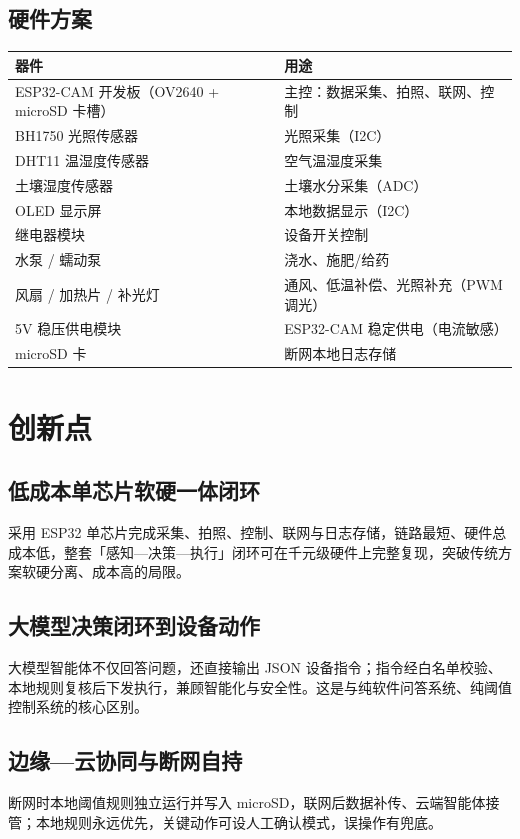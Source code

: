﻿\documentclass[11pt]{ctexart}
\begin{document}
\subsection{硬件方案}
\begin{longtable}{p{6.4cm}p{8.8cm}}
  \toprule
  器件 & 用途 \\
  \midrule
  ESP32-CAM 开发板（OV2640 + microSD 卡槽） & 主控：数据采集、拍照、联网、控制 \\
  BH1750 光照传感器 & 光照采集（I2C） \\
  DHT11 温湿度传感器 & 空气温湿度采集 \\
  土壤湿度传感器 & 土壤水分采集（ADC） \\
  OLED 显示屏 & 本地数据显示（I2C） \\
  继电器模块 & 设备开关控制 \\
  水泵 / 蠕动泵 & 浇水、施肥/给药 \\
  风扇 / 加热片 / 补光灯 & 通风、低温补偿、光照补充（PWM 调光） \\
  5V 稳压供电模块 & ESP32-CAM 稳定供电（电流敏感） \\
  microSD 卡 & 断网本地日志存储 \\
  \bottomrule
\end{longtable}

\section{创新点}
\subsection{低成本单芯片软硬一体闭环}
采用 ESP32 单芯片完成采集、拍照、控制、联网与日志存储，链路最短、硬件总成本低，整套「感知—决策—执行」闭环可在千元级硬件上完整复现，突破传统方案软硬分离、成本高的局限。

\subsection{大模型决策闭环到设备动作}
大模型智能体不仅回答问题，还直接输出 JSON 设备指令；指令经白名单校验、本地规则复核后下发执行，兼顾智能化与安全性。这是与纯软件问答系统、纯阈值控制系统的核心区别。

\subsection{边缘—云协同与断网自持}
断网时本地阈值规则独立运行并写入 microSD，联网后数据补传、云端智能体接管；本地规则永远优先，关键动作可设人工确认模式，误操作有兜底。
\end{document}
